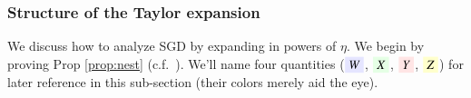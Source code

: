 
    \subsubsection{Structure of the Taylor expansion} %
    We discuss how to analyze SGD by expanding in powers of $\eta$.  We begin
    by proving Prop \ref{prop:nest} (c.f.\ \cite{ne04,ro18}). 
        We'll name four quantities (${\translucent{moosky}{$W$}}$,
        ${\translucent{moolime}{$X$}}$, ${\translucent{moopink}{$Y$}}$,
        ${\translucent{moogold}{$Z$}}$) for later reference in this
        sub-section (their colors merely aid the eye).

